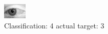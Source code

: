 \begin{figure}[h!]
\begin{center}
\includegraphics[width=0.60\columnwidth]{figures/ID2851_class_4_target_3.png}
\end{center}
\caption{ Classification: 4 actual target: 3}
\label{fig:ID2851_class_4_target_3}
\end{figure}

